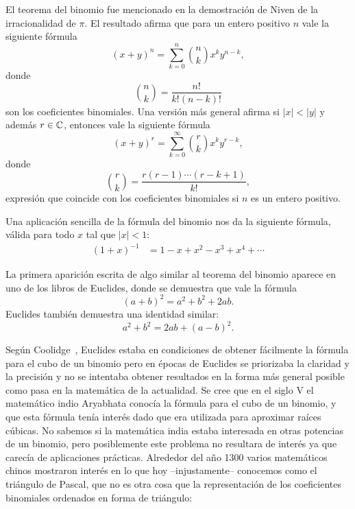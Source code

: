 El teorema del binomio fue mencionado en la demostración de Niven de la
irracionalidad de $\pi$. El resultado afirma que para un entero positivo $n$ vale la siguiente fórmula
\[
	(x+y)^n=\sum_{k=0}^n\binom{n}{k}x^ky^{n-k},
\]
donde
\[
	\binom{n}{k}=\frac{n!}{k!(n-k)!}
\]
son los coeficientes binomiales. Una versión más general afirma si $|x|<|y|$ y además 
$r\in\mathbb{C}$, entonces vale la siguiente fórmula 
\[
	(x+y)^r=\sum_{k=0}^\infty\binom{r}{k}x^{k}y^{r-k},
\]
donde 
\[
	\binom{r}{k}=\frac{r(r-1)\cdots (r-k+1)}{k!},
\]
expresión que coincide con los coeficientes binomiales si $n$ es un entero
positivo. 

\begin{example}
	Una aplicación sencilla de la fórmula del binomio nos da la siguiente fórmula, válida 
	para todo $x$ tal que $|x|<1$:
	\begin{align*}
		(1+x)^{-1}&=1-x+x^2-x^3+x^4+\cdots
	\end{align*}
\end{example}


La primera aparición escrita de algo similar al
teorema del binomio aparece en uno de los libros de Euclides, donde se
demuestra que vale la fórmula
\[
	(a+b)^2=a^2+b^2+2ab.
\]
Euclides también demuestra una identidad similar:
\[
	a^2+b^2=2ab+(a-b)^2.
\]

Según Coolidge~\cite{MR28222}, Euclides estaba en condiciones de obtener
fácilmente la fórmula para el cubo de un binomio pero en épocas de Euclides se
priorizaba la claridad y la precisión y no se intentaba obtener resultados en
la forma más general posible como pasa en la matemática de la actualidad.  Se
cree que en el siglo V el matemático indio Aryabhata conocía la fórmula para el
cubo de un binomio, y que esta fórmula tenía interés dado que era utilizada
para aproximar raíces cúbicas. No sabemos si la matemática india estaba
interesada en otras potencias de un binomio, pero posiblemente este problema no
resultara de interés ya que carecía de aplicaciones prácticas. Alrededor del
año 1300 varios matemáticos chinos mostraron interés en lo que hoy
--injustamente-- conocemos como el triángulo de Pascal, que no es otra cosa que
la representación de los coeficientes binomiales ordenados en forma de
triángulo: 

